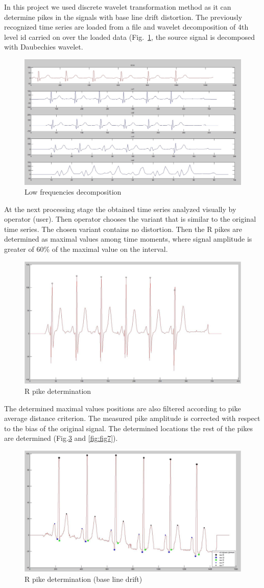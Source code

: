 \documentclass[runningheads]{AIIT}
\newcommand{\nnn}[2][rcolor]{\noindent%
\textcolor{eclr}{}\textcolor{#1}{#2}\textcolor{eclr}{}}
\begin{document}
In this project we used discrete wavelet transformation method as it can determine pikes in the signals with base line drift distortion.  The previously recognized time series are loaded from a file and wavelet decomposition of \nnn{4th level} id carried on over the loaded data (Fig.~\ref{fig:decomp}, the source signal is decomposed with Daubechies wavelet.

\begin{figure}[htb]
  \centering
    \includegraphics[width=0.5\linewidth] {images/Decomposition.jpg}
  \caption{Low frequencies decomposition}
  \label{fig:decomp}
\end{figure}

At the next processing stage the obtained time series analyzed visually by operator (user).  Then operator chooses the variant that is similar to the original time series.  The chosen variant contains no distortion.  Then the R pikes are determined as maximal values among time moments, where signal amplitude is greater of 60\% of the maximal value on the interval.

\begin{figure}[htb]
  \centering
    \includegraphics[width=0.5\linewidth] {images/R-pike.jpg}
  \caption{R pike determination}
  \label{fig:determ-R}
\end{figure}
The determined maximal values positions are also filtered according to pike average distance criterion.  The measured pike amplitude is corrected with respect to the bias of the original signal.  The determined locations the rest of the pikes are determined (Fig.\ref{fig:fig6} and \ref{fig:fig7}).

\begin{figure}[htb]
  \centering
    \includegraphics[width=0.5\linewidth] {images/Drift.jpg}
  \caption{R pike determination (base line drift)}
  \label{fig:fig6}
\end{figure}
\end{document}
